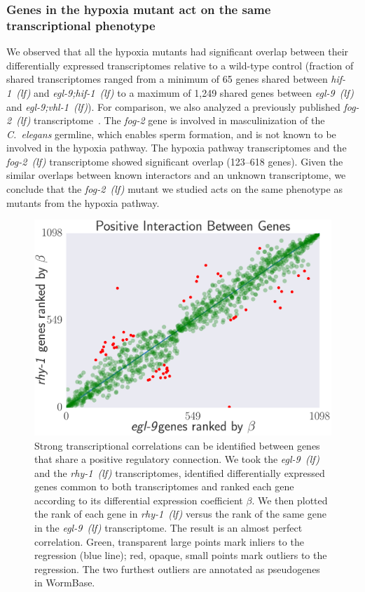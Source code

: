 \documentclass[9pt,twocolumn,twoside]{pnas-new}
\newcommand{\cel}{\emph{C.~elegans}}
\newcommand{\gene}[1]{\emph{#1}}
\newcommand{\fog}{\emph{fog-2~(lf)}}
\newcommand{\egl}{\emph{egl-9~(lf)}}
\newcommand{\rhy}{\emph{rhy-1~(lf)}}
\newcommand{\eglvhl}{\emph{egl-9;vhl-1~(lf)}}
\newcommand{\eglhif}{\emph{egl-9;hif-1~(lf)}}
\newcommand{\hif}{\emph{hif-1~(lf)}}
\begin{document}
\subsubsection{Genes in the hypoxia mutant act on the same transcriptional phenotype}
\label{sec:phenotypes}
We observed that all the hypoxia mutants had significant overlap between their
differentially expressed transcriptomes relative to a wild-type control
(fraction of shared transcriptomes ranged from a minimum of 65 genes
shared between \hif{} and \eglhif{} to a maximum of 1,249 shared genes between
\egl{} and \eglvhl{}). For comparison, we also analyzed a previously published
\fog{} transcriptome~\cite{Angeles-Albores2016a}. The \gene{fog-2} gene is
involved in masculinization of the \cel{} germline, which enables sperm formation,
and is not known to be involved in the hypoxia pathway. The hypoxia
pathway transcriptomes and the \fog{} transcriptome showed significant overlap
(123--618 genes). Given the similar overlaps between known interactors and an
unknown transcriptome, we conclude that the \fog{} mutant we studied acts on the
same phenotype as mutants from the hypoxia pathway.

\begin{figure}%
\centering
\includegraphics[width=\linewidth]{figs/correlative_genetics.pdf}
\caption{
Strong transcriptional correlations can be identified between genes
that share a positive regulatory connection. We took the \egl{} and the \rhy{}
transcriptomes, identified differentially expressed genes common to both
transcriptomes and ranked each gene according to its differential expression
coefficient $\beta$. We then plotted the rank of each gene in \rhy{} versus the
rank of the same gene in the \egl{} transcriptome. The result is an almost
perfect correlation. Green, transparent large points mark inliers to the
regression (blue line); red, opaque, small points mark outliers to the
regression. The two furthest outliers are annotated as pseudogenes in WormBase.
}
\label{fig:genetic_interactions}
\end{figure}
\end{document}
